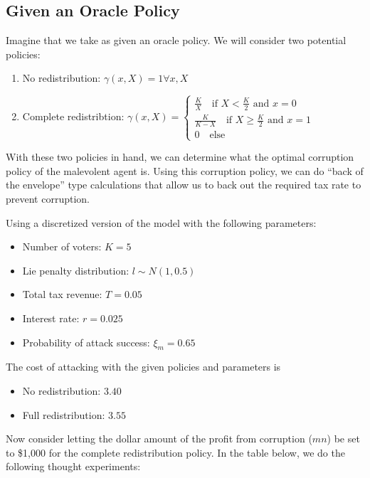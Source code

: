 \documentclass[12pt]{article}
\begin{document}
  \subsection{Given an Oracle Policy}

    Imagine that we take as given an oracle policy. We will consider two potential policies:

    \begin{enumerate}
      \item No redistribution: $\gamma(x, X) = 1 \forall x, X$
      \item Complete redistribtion: $\gamma(x, X) = \begin{cases}
      \frac{K}{X} \quad \text{if } X < \frac{K}{2} \text{ and } x = 0 \\
      \frac{K}{K - X} \quad \text{if } X \geq \frac{K}{2} \text{ and } x = 1 \\
      0 \quad \text{else} \end{cases}$
    \end{enumerate}

    With these two policies in hand, we can determine what the optimal corruption policy of the
    malevolent agent is. Using this corruption policy, we can do ``back of the envelope'' type
    calculations that allow us to back out the required tax rate to prevent corruption.

    Using a discretized version of the model with the following parameters:

    \begin{itemize}
      \item Number of voters: $K=5$
      \item Lie penalty distribution: $l \sim N(1, 0.5)$
      \item Total tax revenue: $T = 0.05$
      \item Interest rate: $r = 0.025$
      \item Probability of attack success: $\xi_m = 0.65$
    \end{itemize}

    The cost of attacking with the given policies and parameters is

    \begin{itemize}
      \item No redistribution: $3.40$
      \item Full redistribution: $3.55$
    \end{itemize}

    Now consider letting the dollar amount of the profit from corruption ($mn$) be set to \$1,000
    for the complete redistribution policy. In the table below, we do the following thought
    experiments:
\end{document}

